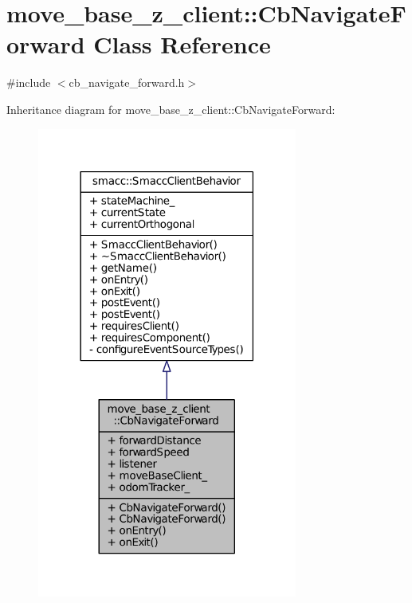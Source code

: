 \hypertarget{classmove__base__z__client_1_1CbNavigateForward}{}\section{move\+\_\+base\+\_\+z\+\_\+client\+:\+:Cb\+Navigate\+Forward Class Reference}
\label{classmove__base__z__client_1_1CbNavigateForward}


{\ttfamily \#include $<$cb\+\_\+navigate\+\_\+forward.\+h$>$}



Inheritance diagram for move\+\_\+base\+\_\+z\+\_\+client\+:\+:Cb\+Navigate\+Forward\+:
\nopagebreak
\begin{figure}[H]
\begin{center}
\leavevmode
\includegraphics[width=242pt]{classmove__base__z__client_1_1CbNavigateForward__inherit__graph}
\end{center}
\end{figure}


